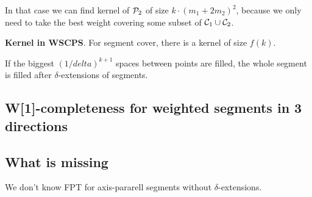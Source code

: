In that case we can find kernel of $\mathcal{P}_2$ of size $k\cdot(m_1 + 2m_2)^2$,
because we only need to take the best weight covering some subset of $\mathcal{C}_1 \cup \mathcal{C}_2$.

\begin{lemma}
	\textbf{Kernel in WSCPS}.
	For segment cover, there is a kernel of size $f(k)$.
\end{lemma}

\begin{lemma}
	If the biggest $(1/delta)^{k+1}$ spaces between points are filled,
	the whole segment is filled after $\delta$-extensions of segments.
\end{lemma}

\subsection{W[1]-completeness for weighted segments in 3 directions}

\subsection{What is missing}
We don't know FPT for axis-pararell segments without $\delta$-extensions.
